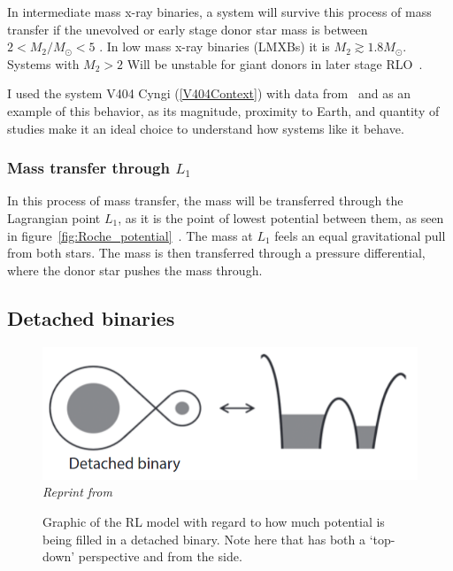 \documentclass[12pt, a4paper]{article}
\begin{document}
        In intermediate mass x-ray binaries, a system will survive this process of mass transfer if the unevolved or early stage donor star mass is between $2 < M_2/M_\odot < 5$ \cite{TaurisvandenHeuvel+2023}. In low mass x-ray binaries (LMXBs) it is $M_2 \gtrsim 1.8 M_\odot$. Systems with $M_2 > 2$ Will be unstable for giant donors in later stage RLO~\cite{TaurisvandenHeuvel+2023}.
        
        I used the system V404 Cyngi (\ref{V404Context}) with data from~\cite{Bernardini_2016} and \cite{Shahbaz_1994} as an example of this behavior, as its magnitude, proximity to Earth, and quantity of studies make it an ideal choice to understand how systems like it behave. 

        \subsubsection{Mass transfer through $L_1$} \label{L1MassTransfer}

        In this process of mass transfer, the mass will be transferred through the Lagrangian point $L_1$, as it is the point of lowest potential between them, as seen in figure~\ref{fig:Roche_potential}~\cite{TaurisvandenHeuvel+2023}. The mass at $L_1$ feels an equal gravitational pull from both stars. The mass is then transferred through a pressure differential, where the donor star pushes the mass through. 

        \subsection{\centering Detached binaries}\label{DetachedBinary}

        \begin{figure}[H]
            \centering
            \includegraphics[scale = .4]{Figs/Detached binary.png}\\
            \textit{Reprint from~\cite{TaurisvandenHeuvel+2023}}
            \caption{Graphic of the RL model with regard to how much potential is being filled in a detached binary. Note here that has both a `top-down' perspective and from the side.}
            \label{DetachedBinaryRL}
        \end{figure}
\end{document}
